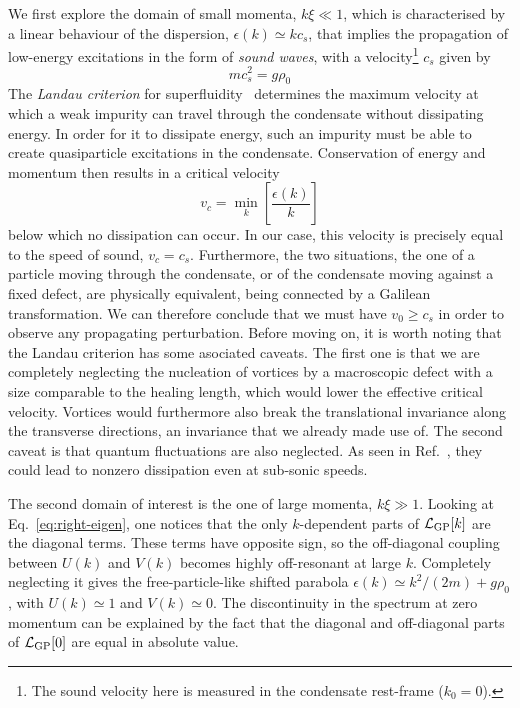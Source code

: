 We first explore the domain of small momenta, $k\xi \ll 1$, which is
characterised by a linear behaviour of the dispersion,
$\epsilon(k) \simeq k c_s$, that implies the propagation of low-energy
excitations in the form of \textit{sound waves}, with a
velocity\footnote{The sound velocity here is measured in the
  condensate rest-frame ($k_0 = 0$).} $c_s$ given by
%
\begin{equation}\label{eq:sound-velocity}
  mc^2_s = g \rho_0
\end{equation}
% 
The \textit{Landau criterion} for superfluidity~\cite{9780198507192}
determines the maximum velocity at which a weak impurity can travel
through the condensate without dissipating energy. In order for it to
dissipate energy, such an impurity must be able to create
quasiparticle excitations in the condensate. Conservation of energy
and momentum then results in a critical velocity
%
\begin{equation}\label{eq:Landau}
  v_c=\min_{k} \left[\frac{\epsilon(k)}{k}\right]
\end{equation}
% 
below which no dissipation can occur. In our case, this velocity is
precisely equal to the speed of sound, $v_c =
c_s$. Furthermore, the two situations, the one of a particle moving
through the condensate, or of the condensate moving against a fixed
defect, are physically equivalent, being connected by a Galilean
transformation. We can therefore conclude that we must have
$v_0 \geq c_s$ in order to observe any propagating
perturbation. Before moving on, it is worth noting that the Landau
criterion has some asociated caveats. The first one is that we are
completely neglecting the nucleation of vortices by a macroscopic
defect with a size comparable to the healing length, which would lower
the effective critical velocity. Vortices would furthermore also break
the translational invariance along the transverse directions, an
invariance that we already made use of. The second caveat is that
quantum fluctuations are also neglected. As seen in
Ref.~\cite{Astrakharchik_2004}, they could lead to nonzero dissipation
even at sub-sonic speeds.

The second domain of interest is the one of large momenta,
$k\xi \gg 1$. Looking at Eq.~\eqref{eq:right-eigen}, one notices that
the only $k$-dependent parts of $\mathcal{L}_{\text{GP}} [k]$ are the
diagonal terms. These terms have opposite sign, so the off-diagonal
coupling between $U(k)$ and $V(k)$ becomes highly off-resonant at
large $k$. Completely neglecting it gives the free-particle-like
shifted parabola $\epsilon(k) \simeq k^2/(2m)+g\rho_0$, with
$U(k) \simeq 1$ and $V(k) \simeq 0$.
%
The discontinuity in the spectrum at zero momentum can be explained by
the fact that the diagonal and off-diagonal parts of $\mathcal{L}_{\text{GP}}
[0]$ are equal in absolute value.

